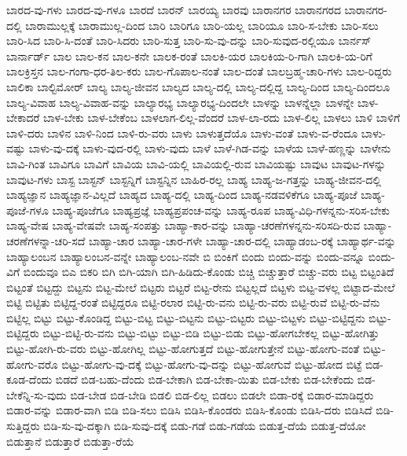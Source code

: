 {ಬಾರದ-ವು-ಗಳು
ಬಾರದ-ವು-ಗಳೂ
ಬಾರದೆ
ಬಾರನ್
ಬಾರಯ್ಯ
ಬಾರವು
ಬಾರಾನಗರ
ಬಾರಾನಗರದ
ಬಾರಾನಗರ-ದಲ್ಲಿ
ಬಾರಾಮುಲ್ಲಕ್ಕೆ
ಬಾರಾಮುಲ್ಲ-ದಿಂದ
ಬಾರಿ
ಬಾರಿಗೂ
ಬಾರಿ-ಯಲ್ಲ
ಬಾರಿಯೂ
ಬಾರಿ-ಸ-ಬೇಕು
ಬಾರಿ-ಸಲು
ಬಾರಿ-ಸಿದ
ಬಾರಿ-ಸಿ-ದಂತೆ
ಬಾರಿ-ಸಿದರು
ಬಾರಿ-ಸುತ್ತ
ಬಾರಿ-ಸು-ವು-ದನ್ನು
ಬಾರಿ-ಸುವುದ-ರಲ್ಲಿಯೂ
ಬಾರ್ನಸ್
ಬಾರ್ನಾರ್ಡ್
ಬಾಲ
ಬಾಲ-ಕನ
ಬಾಲ-ಕನೇ
ಬಾಲಕ-ರಂತೆ
ಬಾಲಕಿ-ಯರ
ಬಾಲಕಿಯ-ರಿ-ಗಾಗಿ
ಬಾಲಕಿ-ಯ-ರಿಗೆ
ಬಾಲಕ್ರಿಸ್ತನ
ಬಾಲ-ಗಂಗಾ-ಧರ-ತಿಲ-ಕರು
ಬಾಲ-ಗೊಪಾಲ-ನಂತೆ
ಬಾಲ-ದಂತೆ
ಬಾಲಬ್ರಹ್ಮ-ಚಾರಿ-ಗಳು
ಬಾಲ-ರಿದ್ದರು
ಬಾಲಿಕಾ
ಬಾಲ್ಟಿಮೋರ್
ಬಾಲ್ಯ
ಬಾಲ್ಯ-ಜೀವನ
ಬಾಲ್ಯದ
ಬಾಲ್ಯ-ದಲ್ಲಿ
ಬಾಲ್ಯ-ದಲ್ಲಿದ್ದ
ಬಾಲ್ಯ-ದಿಂದ
ಬಾಲ್ಯ-ದಿಂದಲೂ
ಬಾಲ್ಯ-ವಿವಾಹ
ಬಾಲ್ಯ-ವಿವಾಹ-ವನ್ನು
ಬಾಲ್ಯಾರಭ್ಯ
ಬಾಲ್ಯಾರಭ್ಯ-ದಿಂದಲೇ
ಬಾಳನ್ನು
ಬಾಳನ್ನೆಲ್ಲಾ
ಬಾಳನ್ನೇ
ಬಾಳ-ಬೇಕಾದರೆ
ಬಾಳ-ಬೇಕು
ಬಾಳ-ಬೇಕೆಂಬ
ಬಾಳಲಾಗ-ಲಿಲ್ಲ-ವೆಂದರೆ
ಬಾಳ-ಲಾ-ರದು
ಬಾಳ-ಲಿಲ್ಲ
ಬಾಳಲು
ಬಾಳಿ
ಬಾಳಿಗೆ
ಬಾಳಿ-ದರು
ಬಾಳಿನ
ಬಾಳಿ-ನಿಂದ
ಬಾಳಿ-ರು-ವರು
ಬಾಳು
ಬಾಳುತ್ತದೆಯೊ
ಬಾಳು-ವಂತೆ
ಬಾಳು-ವ-ರೆಂದೂ
ಬಾಳು-ವಷ್ಟು
ಬಾಳು-ವು-ದಕ್ಕೆ
ಬಾಳು-ವುದ-ರಲ್ಲಿ
ಬಾಳು-ವುದು
ಬಾಳೆ
ಬಾಳೆ-ಗಿಡ-ವನ್ನು
ಬಾಳೆಯ
ಬಾಳೆ-ಹಣ್ಣನ್ನು
ಬಾಳೇನು
ಬಾವಿ-ಗಿಂತ
ಬಾವಿಗೂ
ಬಾವಿಗೆ
ಬಾವಿಯ
ಬಾವಿ-ಯಲ್ಲಿ
ಬಾವಿಯಲ್ಲಿ-ರುವ
ಬಾವಿಯಷ್ಟು
ಬಾವುಟ
ಬಾವುಟ-ಗಳನ್ನು
ಬಾವುಟ-ಗಳು
ಬಾಸ್ಟ
ಬಾಸ್ಟನ್
ಬಾಸ್ಟನ್ನಿಗೆ
ಬಾಸ್ಟನ್ನಿನ
ಬಾಹಿರ-ರಲ್ಲ
ಬಾಹ್ಯ
ಬಾಹ್ಯ-ಜ-ಗತ್ತನ್ನು
ಬಾಹ್ಯ-ಜೀವನ-ದಲ್ಲಿ
ಬಾಹ್ಯಜ್ಞಾನ
ಬಾಹ್ಯಜ್ಞಾನ-ವಿಲ್ಲದೆ
ಬಾಹ್ಯದ
ಬಾಹ್ಯ-ದಲ್ಲಿ
ಬಾಹ್ಯ-ದಿಂದ
ಬಾಹ್ಯ-ನಡವಳಿಕೆಗೂ
ಬಾಹ್ಯ-ಪೂಜೆ
ಬಾಹ್ಯ-ಪೂಜೆ-ಗಳೂ
ಬಾಹ್ಯ-ಪೂಜೆಗೂ
ಬಾಹ್ಯಪ್ರಜ್ಞೆ
ಬಾಹ್ಯಪ್ರಪಂಚ-ವನ್ನು
ಬಾಹ್ಯ-ರೂಪ
ಬಾಹ್ಯ-ವಿಧಿ-ಗಳನ್ನನು-ಸರಿಸ-ಬೇಕು
ಬಾಹ್ಯ-ವೇಷ
ಬಾಹ್ಯ-ವೇಷವೇ
ಬಾಹ್ಯ-ಸಂಪತ್ತು
ಬಾಹ್ಯಾ-ಕಾರ-ವನ್ನು
ಬಾಹ್ಯಾ-ಚರಣೆಗಳನ್ನನು-ಸರಿಸದಿ-ರುವ
ಬಾಹ್ಯಾ-ಚರಣೆಗಳನ್ನಾ-ಚರಿ-ಸದೆ
ಬಾಹ್ಯಾ-ಚಾರ
ಬಾಹ್ಯಾ-ಚಾರ-ಗಳೇ
ಬಾಹ್ಯಾ-ಚಾರ-ದಲ್ಲಿ
ಬಾಹ್ಯಾಡಂಬ-ರಕ್ಕೆ
ಬಾಹ್ಯಾರ್ಥ-ವನ್ನು
ಬಾಹ್ಯಾಲಂಬನ
ಬಾಹ್ಯಾಲಂಬನ-ವನ್ನೇ
ಬಾಹ್ಯಾಲಂಬ-ನವೇ
ಬಿ
ಬಿಂಕಿಗೆ
ಬಿಂದು
ಬಿಂದು-ವನ್ನು
ಬಿಂದು-ವನ್ನೂ
ಬಿಂದು-ವಿಗೆ
ಬಿಂದುವೂ
ಬಿಎ
ಬಿಕರಿ
ಬಿಗಿ
ಬಿಗಿ-ಯಾಗಿ
ಬಿಗಿ-ಹಿಡಿದು-ಕೊಂಡು
ಬಿಚ್ಚಿ
ಬಿಚ್ಚುತ್ತಾರೆ
ಬಿಚ್ಚು-ವರು
ಬಿಟ್ಟ
ಬಿಟ್ಟಂತಿದೆ
ಬಿಟ್ಟಂತೆ
ಬಿಟ್ಟದ್ದು
ಬಿಟ್ಟನು
ಬಿಟ್ಟ-ಮೇಲೆ
ಬಿಟ್ಟರು
ಬಿಟ್ಟರೆ
ಬಿಟ್ಟ-ರೇನು
ಬಿಟ್ಟಲ್ಲದೆ
ಬಿಟ್ಟಳು
ಬಿಟ್ಟ-ವಳಲ್ಲ
ಬಿಟ್ಟಾದ-ಮೇಲೆ
ಬಿಟ್ಟಿ
ಬಿಟ್ಟಿತು
ಬಿಟ್ಟಿದ್ದ-ರಂತೆ
ಬಿಟ್ಟಿದ್ದರೂ
ಬಿಟ್ಟಿ-ರಲಾರ
ಬಿಟ್ಟಿ-ರು-ವನು
ಬಿಟ್ಟಿ-ರು-ವರು
ಬಿಟ್ಟಿ-ರುವೆ
ಬಿಟ್ಟಿ-ರು-ವೆನು
ಬಿಟ್ಟಿಲ್ಲ
ಬಿಟ್ಟು
ಬಿಟ್ಟು-ಕೊಂಡಿದ್ದ
ಬಿಟ್ಟು-ಬಿಟ್ಟ
ಬಿಟ್ಟು-ಬಿಟ್ಟನು
ಬಿಟ್ಟು-ಬಿಟ್ಟರು
ಬಿಟ್ಟು-ಬಿಟ್ಟಳು
ಬಿಟ್ಟು-ಬಿಟ್ಟಿದ್ದನು
ಬಿಟ್ಟು-ಬಿಟ್ಟಿದ್ದರು
ಬಿಟ್ಟು-ಬಿಟ್ಟಿ-ರು-ವನು
ಬಿಟ್ಟು-ಬಿಟ್ಟು
ಬಿಟ್ಟು-ಬಿಡಿ
ಬಿಟ್ಟು-ಬಿಡು
ಬಿಟ್ಟು-ಹೋಗಬೇಕಲ್ಲ
ಬಿಟ್ಟು-ಹೋಗಿತ್ತು
ಬಿಟ್ಟು-ಹೋಗಿ-ರು-ವರು
ಬಿಟ್ಟು-ಹೋಗಿಲ್ಲ
ಬಿಟ್ಟು-ಹೋಗುತ್ತದೆ
ಬಿಟ್ಟು-ಹೋಗುತ್ತೇನೆ
ಬಿಟ್ಟು-ಹೋಗು-ವಂತೆ
ಬಿಟ್ಟು-ಹೋಗು-ವರೊ
ಬಿಟ್ಟು-ಹೋಗು-ವು-ದಕ್ಕೆ
ಬಿಟ್ಟು-ಹೋಗು-ವು-ದನ್ನು
ಬಿಟ್ಟು-ಹೋಗುವೆ
ಬಿಟ್ಟು-ಹೋದ
ಬಿಟ್ಟೆ
ಬಿಡ-ಕೂಡ-ದೆಂದು
ಬಿಡದೆ
ಬಿಡ-ಬಹು-ದೆಂದು
ಬಿಡ-ಬೇಕಾಗಿ
ಬಿಡ-ಬೇಕಾ-ಯಿತು
ಬಿಡ-ಬೇಕು
ಬಿಡ-ಬೇಕೆಂದು
ಬಿಡ-ಬೇಕೆನ್ನಿ-ಸು-ವುದು
ಬಿಡ-ಬೇಡ
ಬಿಡ-ಬೇಡಿ
ಬಿಡಲಿ
ಬಿಡ-ಲಿಲ್ಲ
ಬಿಡಲು
ಬಿಡಲೇ
ಬಿಡಾ-ರಕ್ಕೆ
ಬಿಡಾರ-ಮಾಡಿದ್ದರು
ಬಿಡಾರ-ವನ್ನು
ಬಿಡಾರ-ವಾಗಿ
ಬಿಡಿ
ಬಿಡಿ-ಸಲು
ಬಿಡಿಸಿ
ಬಿಡಿಸಿ-ಕೊಂಡರು
ಬಿಡಿಸಿ-ಕೊಂಡು
ಬಿಡಿಸಿ-ದರು
ಬಿಡಿಸಿದೆ
ಬಿಡಿ-ಸುತ್ತಿದ್ದರು
ಬಿಡಿ-ಸು-ವು-ದಕ್ಕಾಗಿ
ಬಿಡಿ-ಸುವು-ದಕ್ಕೆ
ಬಿಡು-ಗಡೆ
ಬಿಡು-ಗಡೆಯ
ಬಿಡುತ್ತ-ದೆಯೆ
ಬಿಡುತ್ತ-ದೆಯೋ
ಬಿಡುತ್ತಾನೆ
ಬಿಡುತ್ತಾರೆ
ಬಿಡುತ್ತಾ-ರೆಯೆ
}
